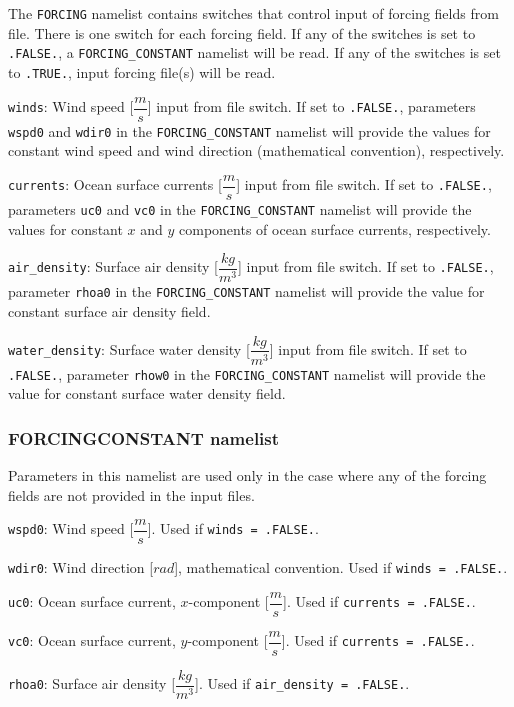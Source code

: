 \documentclass[letterpaper]{article}
\numberwithin{equation}{section}
\begin{document}
The \verb+FORCING+ namelist contains switches that control input of forcing fields
from file. There is one switch for each forcing field. If any of the switches is 
set to \verb+.FALSE.+, a \verb+FORCING_CONSTANT+ namelist will be read. 
If any of the switches is set to \verb+.TRUE.+, input forcing file(s) will be read.

\verb+winds+:
Wind speed [$\dfrac{m}{s}$] input from file switch.
If set to \verb+.FALSE.+, parameters \verb+wspd0+ and \verb+wdir0+ in 
the \verb+FORCING_CONSTANT+ namelist will provide the values for constant wind speed
and wind direction (mathematical convention), respectively.

\verb+currents+:
Ocean surface currents [$\dfrac{m}{s}$] input from file switch.
If set to \verb+.FALSE.+, parameters \verb+uc0+ and \verb+vc0+ in 
the \verb+FORCING_CONSTANT+ namelist will provide the values for constant $x$
and $y$ components of ocean surface currents, respectively.

\verb+air_density+:
Surface air density [$\dfrac{kg}{m^{3}}$] input from file switch.
If set to \verb+.FALSE.+, parameter \verb+rhoa0+ in 
the \verb+FORCING_CONSTANT+ namelist will provide the value for constant
surface air density field.

\verb+water_density+:
Surface water density [$\dfrac{kg}{m^{3}}$] input from file switch.
If set to \verb+.FALSE.+, parameter \verb+rhow0+ in 
the \verb+FORCING_CONSTANT+ namelist will provide the value for constant
surface water density field.

\subsubsection{FORCING\textunderscore CONSTANT namelist}

Parameters in this namelist are used only in the case where any of the 
forcing fields are not provided in the input files. 

\verb+wspd0+:
Wind speed [$\dfrac{m}{s}$]. Used if \verb+winds = .FALSE.+.

\verb+wdir0+:
Wind direction [$rad$], mathematical convention. Used if \verb+winds = .FALSE.+.

\verb+uc0+:
Ocean surface current, $x$-component [$\dfrac{m}{s}$]. Used if \verb+currents = .FALSE.+.

\verb+vc0+:
Ocean surface current, $y$-component [$\dfrac{m}{s}$]. Used if \verb+currents = .FALSE.+.

\verb+rhoa0+:
Surface air density [$\dfrac{kg}{m^{3}}$]. Used if \verb+air_density = .FALSE.+. 
\end{document}
